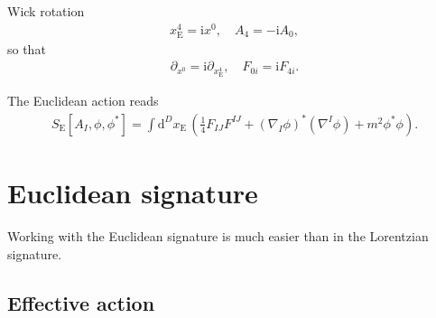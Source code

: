 \documentclass[12pt]{article}
\newcommand\mi{\mathrm{i}} %
\newcommand\dif{\mathrm{d}}
\newcommand{\rbr}[1]{{\left(#1\right)}}
\newcommand{\sfun}[2]{{#1}\mathopen{}\left[#2\right]\mathclose{}}
\begin{document}
Wick rotation
\begin{align}
x_\text{E}^4 = \mi x^0,\quad A_4 = -\mi A_0,
\end{align}
so that
\begin{align}
\partial_{x^0} = \mi \partial_{x_\text{E}^4},\quad
F_{0i} = \mi F_{4i}.
\end{align}

The Euclidean action reads
\begin{align}
\sfun{S_\text{E}}{A_I,\phi,\phi^*} = \int \dif^{D} x_\text{E}\,\rbr{
	\frac{1}{4} F_{IJ} F^{IJ} + \rbr{\nabla_{\!I}\phi}^* \rbr{\nabla^I \phi} 
	+ m^2 \phi^* \phi}.
\end{align}


\section{Euclidean signature}
\label{sec:eucl}

Working with the Euclidean signature is much easier than in the Lorentzian 
signature.

\subsection{Effective action}
\label{ssec:eucl-effe}
\end{document}
